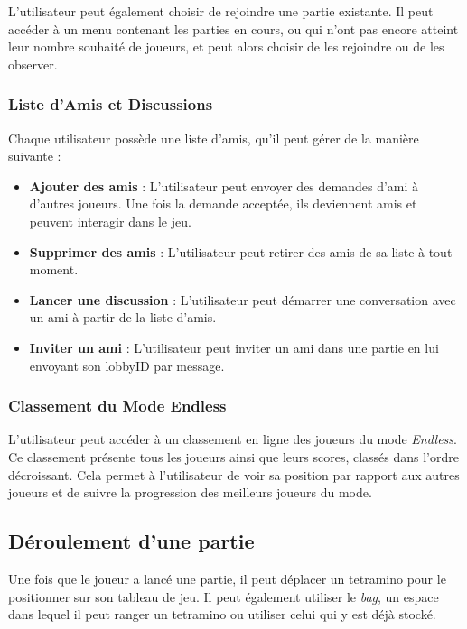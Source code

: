 \documentclass{report}
\begin{document}
\noindent L'utilisateur peut également choisir de rejoindre une partie existante. Il peut accéder à un menu contenant les parties en cours, ou qui n'ont pas encore atteint leur nombre souhaité de joueurs, et peut alors choisir de les rejoindre ou de les observer.


\subsubsection{Liste d'Amis et Discussions}

\noindent Chaque utilisateur possède une liste d'amis, qu'il peut gérer de la manière suivante :

\begin{itemize}
    \item \textbf{Ajouter des amis} : L'utilisateur peut envoyer des demandes d'ami à d'autres joueurs. Une fois la demande acceptée, ils deviennent amis et peuvent interagir dans le jeu.
    \item \textbf{Supprimer des amis} : L'utilisateur peut retirer des amis de sa liste à tout moment.
    \item \textbf{Lancer une discussion} : L'utilisateur peut démarrer une conversation avec un ami à partir de la liste d'amis.
    \item \textbf{Inviter un ami} : L'utilisateur peut inviter un ami dans une partie en lui envoyant son lobbyID par message.
\end{itemize}

\subsubsection{Classement du Mode Endless}

\noindent L'utilisateur peut accéder à un classement en ligne des joueurs du mode \emph{Endless}. Ce classement présente tous les joueurs ainsi que leurs scores, classés dans l'ordre décroissant. Cela permet à l'utilisateur de voir sa position par rapport aux autres joueurs et de suivre la progression des meilleurs joueurs du mode.





\subsection{Déroulement d’une partie}

\noindent Une fois que le joueur a lancé une partie, il peut déplacer un tetramino pour le positionner sur son tableau de jeu. Il peut également utiliser le \emph{bag}, un espace dans lequel il peut ranger un tetramino ou utiliser celui qui y est déjà stocké. \\
\end{document}
